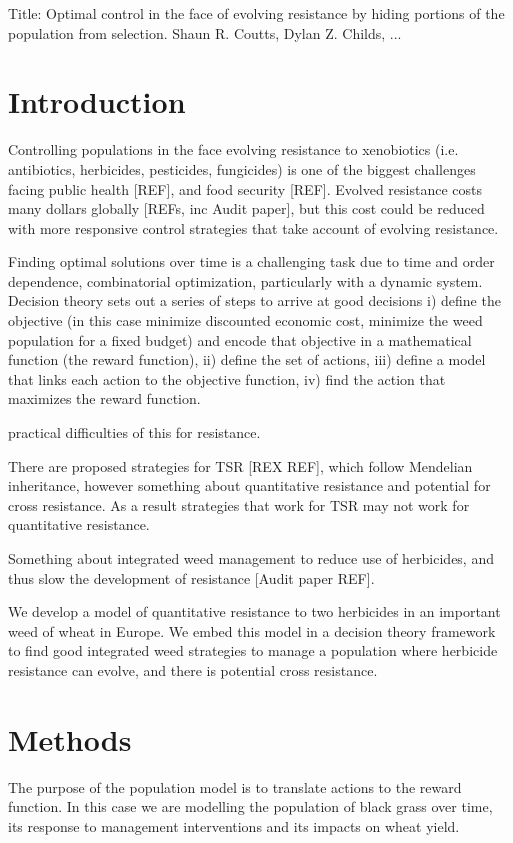 \documentclass[12pt, a4paper]{article}
\begin{document}
Title: Optimal control in the face of evolving resistance by hiding portions of the population from selection.
Shaun R. Coutts, Dylan Z. Childs, ...

\section*{Introduction}
Controlling populations in the face evolving resistance to xenobiotics (i.e. antibiotics, herbicides, pesticides, fungicides) is one of the biggest challenges facing public health [REF], and food security [REF]. Evolved resistance costs many dollars globally [REFs, inc Audit paper], but this cost could be reduced with more responsive control strategies that take account of evolving resistance.

Finding optimal solutions over time is a challenging task due to time and order dependence, combinatorial optimization, particularly with a dynamic system. Decision theory sets out a series of steps to arrive at good decisions i) define the objective (in this case minimize discounted economic cost, minimize the weed population for a fixed budget) and encode that objective in a mathematical function (the reward function), ii) define the set of actions, iii) define a model that links each action to the objective function, iv) find the action that maximizes the reward function.

practical difficulties of this for resistance.           

There are proposed strategies for TSR [REX REF], which follow Mendelian inheritance, however something about quantitative resistance and potential for cross resistance. As a result strategies that work for TSR may not work for quantitative resistance.

Something about integrated weed management to reduce use of herbicides, and thus slow the development of resistance [Audit paper REF].      

We develop a model of quantitative resistance to two herbicides in an important weed of wheat in Europe. We embed this model in a decision theory framework to find good integrated weed strategies to manage a population where herbicide resistance can evolve, and there is potential cross resistance.        

\section*{Methods}
The purpose of the population model is to translate actions to the reward function. In this case we are modelling the population of black grass over time, its response to management interventions and its impacts on wheat yield.  
\end{document}
